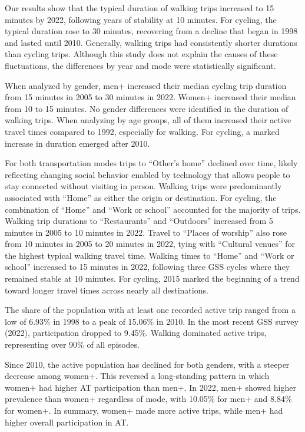\documentclass[preprint, 3p,
authoryear]{elsarticle} %
\begin{document}
Our results show that the typical duration of walking trips increased to
15 minutes by 2022, following years of stability at 10 minutes. For
cycling, the typical duration rose to 30 minutes, recovering from a
decline that began in 1998 and lasted until 2010. Generally, walking
trips had consistently shorter durations than cycling trips. Although
this study does not explain the causes of these fluctuations, the
differences by year and mode were statistically significant.

When analyzed by gender, men+ increased their median cycling trip
duration from 15 minutes in 2005 to 30 minutes in 2022. Women+ increased
their median from 10 to 15 minutes. No gender differences were
identified in the duration of walking trips. When analyzing by age
groups, all of them increased their active travel times compared to
1992, especially for walking. For cycling, a marked increase in duration
emerged after 2010.

For both transportation modes trips to ``Other's home'' declined over
time, likely reflecting changing social behavior enabled by technology
that allows people to stay connected without visiting in person. Walking
trips were predominantly associated with ``Home'' as either the origin
or destination. For cycling, the combination of ``Home'' and ``Work or
school'' accounted for the majority of trips. Walking trip durations to
``Restaurants'' and ``Outdoors'' increased from 5 minutes in 2005 to 10
minutes in 2022. Travel to ``Places of worship'' also rose from 10
minutes in 2005 to 20 minutes in 2022, tying with ``Cultural venues''
for the highest typical walking travel time. Walking times to ``Home''
and ``Work or school'' increased to 15 minutes in 2022, following three
GSS cycles where they remained stable at 10 minutes. For cycling, 2015
marked the beginning of a trend toward longer travel times across nearly
all destinations.

The share of the population with at least one recorded active trip
ranged from a low of 6.93\% in 1998 to a peak of 15.06\% in 2010. In the
most recent GSS survey (2022), participation dropped to 9.45\%. Walking
dominated active trips, representing over 90\% of all episodes.

Since 2010, the active population has declined for both genders, with a
steeper decrease among women+. This reversed a long-standing pattern in
which women+ had higher AT participation than men+. In 2022, men+ showed
higher prevalence than women+ regardless of mode, with 10.05\% for men+
and 8.84\% for women+. In summary, women+ made more active trips, while
men+ had higher overall participation in AT.
\end{document}
